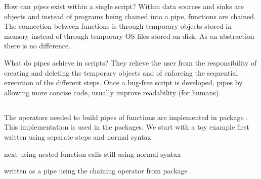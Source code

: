 \documentclass[krantz2]{krantz}\usepackage{knitr}%
\begin{document}
How can \emph{pipes} exist within a single \Rlang script? Within \Rlang data sources and sinks are \Rlang objects and instead of programs being chained into a pipe, functions are chained. The connection between functions is through temporary \Rlang objects stored in memory instead of through temporary OS files stored on disk. As an abstraction there is no difference.

What do pipes achieve in \Rlang scripts? They relieve the user from the responsibility of creating and deleting the temporary objects and of enforcing the sequential execution of the different steps. Once a bug-free script is developed, pipes by allowing more concise code, usually improve readability (for humans).

\subsection{}

The operators needed to build pipes of \Rlang functions are implemented in package . This implementation is used in the  packages.
We start with a toy example first written using separate steps and normal \Rlang syntax
\begin{knitrout}\footnotesize
{}\color{fgcolor}\begin{kframe}
\begin{alltt}
 \hlkwb{<-} \hlopt{:}
 \hlkwb{<-} 
 \hlkwb{<-} 
 
\end{alltt}
\end{kframe}
\end{knitrout}

next using nested function calls still using normal \Rlang syntax
\begin{knitrout}\footnotesize
{}\color{fgcolor}\begin{kframe}
\begin{alltt}
 \hlkwb{<-} \hlstd{(}
\end{alltt}
\end{kframe}
\end{knitrout}

written as a pipe using the chaining operator from package .
\begin{knitrout}\footnotesize
{}\color{fgcolor}
\end{knitrout}
\end{document}
